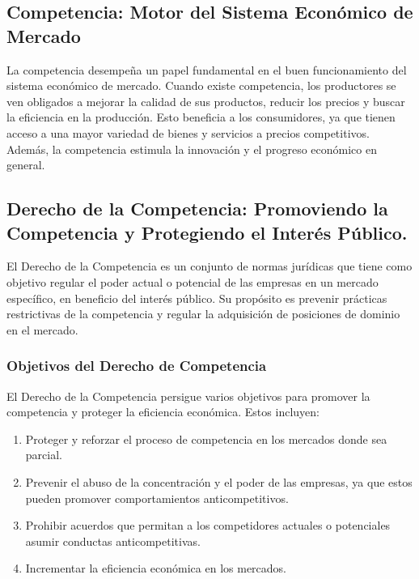 \documentclass[
  a4paper,
]{article}
\providecommand{\tightlist}{%
  \setlength{\itemsep}{0pt}\setlength{\parskip}{0pt}}\usepackage{longtable,booktabs,array}
\begin{document}
\hypertarget{competencia-motor-del-sistema-econuxf3mico-de-mercado}{%
\subsection{Competencia: Motor del Sistema Económico de
Mercado}\label{competencia-motor-del-sistema-econuxf3mico-de-mercado}}

La competencia desempeña un papel fundamental en el buen funcionamiento
del sistema económico de mercado. Cuando existe competencia, los
productores se ven obligados a mejorar la calidad de sus productos,
reducir los precios y buscar la eficiencia en la producción. Esto
beneficia a los consumidores, ya que tienen acceso a una mayor variedad
de bienes y servicios a precios competitivos. Además, la competencia
estimula la innovación y el progreso económico en general.

\hypertarget{derecho-de-la-competencia-promoviendo-la-competencia-y-protegiendo-el-interuxe9s-puxfablico.}{%
\subsection{Derecho de la Competencia: Promoviendo la Competencia y
Protegiendo el Interés
Público.}\label{derecho-de-la-competencia-promoviendo-la-competencia-y-protegiendo-el-interuxe9s-puxfablico.}}

El Derecho de la Competencia es un conjunto de normas jurídicas que
tiene como objetivo regular el poder actual o potencial de las empresas
en un mercado específico, en beneficio del interés público. Su propósito
es prevenir prácticas restrictivas de la competencia y regular la
adquisición de posiciones de dominio en el mercado.

\hypertarget{objetivos-del-derecho-de-competencia}{%
\subsubsection{Objetivos del Derecho de
Competencia}\label{objetivos-del-derecho-de-competencia}}

El Derecho de la Competencia persigue varios objetivos para promover la
competencia y proteger la eficiencia económica. Estos incluyen:

\begin{enumerate}
\def\labelenumi{\arabic{enumi}.}
\tightlist
\item
  Proteger y reforzar el proceso de competencia en los mercados donde
  sea parcial.
\item
  Prevenir el abuso de la concentración y el poder de las empresas, ya
  que estos pueden promover comportamientos anticompetitivos.
\item
  Prohibir acuerdos que permitan a los competidores actuales o
  potenciales asumir conductas anticompetitivas.
\item
  Incrementar la eficiencia económica en los mercados.
\end{enumerate}
\end{document}
